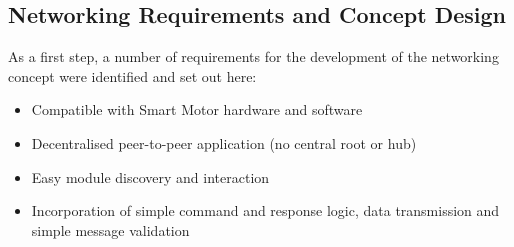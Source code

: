 \subsection{\label{sec:methods_net_des}Networking Requirements and Concept Design}

As a first step, a number of requirements for the development of the networking concept were identified and set out here:
\begin{itemize}
    \item Compatible with Smart Motor hardware and software
    \item Decentralised peer-to-peer application (no central root or hub)
    \item Easy module discovery and interaction
    \item Incorporation of simple command and response logic, data transmission and simple message validation
\end{itemize}

